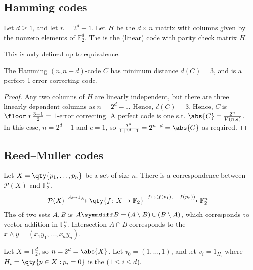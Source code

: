 \subsection{Hamming codes}

\begin{definition}
    Let $d \geq 1$, and let $n = 2^d - 1$.
    Let $H$ be the $d \times n$ matrix with columns given by the nonzero elements of $\mathbb F_2^d$.
    The  is the (linear) code with parity check matrix $H$.
\end{definition}

\begin{remark}
    This is only defined up to equivalence.
\end{remark}

\begin{lemma}
    The Hamming $(n, n-d)$-code $C$ has minimum distance $d(C) = 3$, and is a perfect 1-error correcting code.
\end{lemma}

\begin{proof}
    Any two columns of $H$ are linearly independent, but there are three linearly dependent columns as $n = 2^d-1$.
    Hence, $d(C) = 3$.
    Hence, $C$ is $\floor*{\frac{3-1}{2}} = 1$-error correcting.
    A perfect code is one s.t. $\abs{C} = \frac{2^n}{V(n,e)}$.
    In this case, $n = 2^d - 1$ and $e = 1$, so $\frac{2^n}{1 + 2^d - 1} = 2^{n-d} = \abs{C}$ as required.
\end{proof}

\subsection{Reed--Muller codes}
Let $X = \qty{p_1, \dots, p_n}$ be a set of size $n$.
There is a correspondence between $\mathcal P(X)$ and $\mathbb F_2^n$.
\begin{align*}
    \mathcal P(X) \xrightarrow{A \mapsto 1_A} \qty{f \colon X \to \mathbb F_2} \xrightarrow{f \mapsto (f(p_1), \dots, f(p_n))} \mathbb F_2^n
\end{align*}
The  of two sets $A, B$ is $A \symmdiff B = (A\setminus B) \cup (B \setminus A)$, which corresponds to vector addition in $\mathbb F_2^n$.
Intersection $A \cap B$ corresponds to the  $x \wedge y = (x_1 y_1, \dots, x_n y_n)$.

Let $X = \mathbb F_2^d$, so $n = 2^d = \abs{X}$.
Let $v_0 = (1, \dots, 1)$, and let $v_i = 1_{H_i}$ where $H_i = \qty{p \in X : p_i = 0}$ is the  ($1 \leq i \leq d$).

